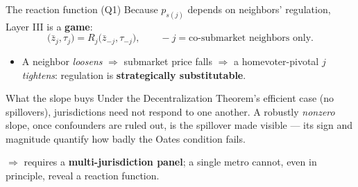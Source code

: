 \documentclass[10pt,aspectratio=169]{beamer}
\begin{document}
\begin{frame}{The reaction function (Q1)}
Because $p_{s(j)}$ depends on neighbors' regulation, Layer III is a \textbf{game}:
\[ \big(\bar z_j,\tau_j\big) = R_j\big(\bar z_{-j},\tau_{-j}\big),\qquad
   -j = \text{co-submarket neighbors only}. \]
\begin{itemize}
  \item A neighbor \emph{loosens} $\Rightarrow$ submarket price falls $\Rightarrow$ a
  homevoter-pivotal $j$ \emph{tightens}: regulation is \textbf{strategically substitutable}.
\end{itemize}
\begin{block}{What the slope buys}
Under the Decentralization Theorem's efficient case (no spillovers), jurisdictions need not
respond to one another. A robustly \emph{nonzero} slope, once confounders are ruled out, is
the spillover made visible --- its sign and magnitude quantify how badly the Oates condition
fails.
\end{block}
\footnotesize $\Rightarrow$ requires a \textbf{multi-jurisdiction panel}; a single metro cannot,
even in principle, reveal a reaction function.
\end{frame}
\end{document}
